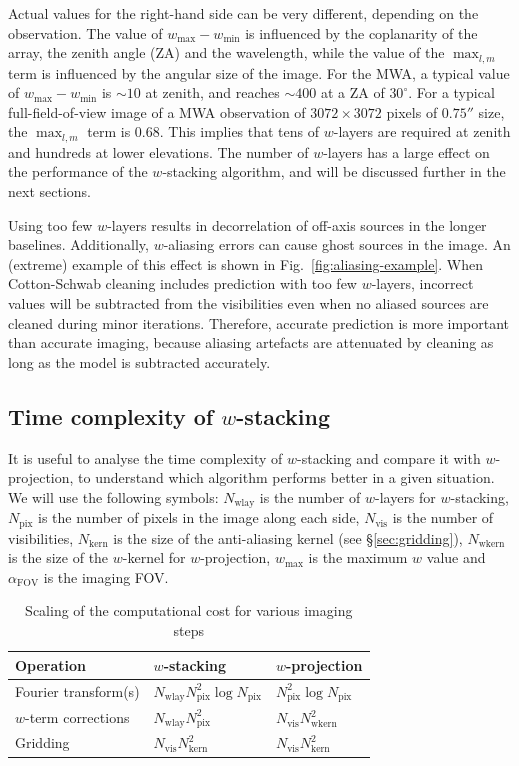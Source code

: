\documentclass[useAMS,usenatbib]{mn2e}
\begin{document}
Actual values for the right-hand side can be very different, depending on the observation. The value of $w_{\max} - w_{\min}$ is influenced by the coplanarity of the array, the zenith angle (ZA) and the wavelength, while the value of the $\max_{l,m}$ term is influenced by the angular size of the image. For the MWA, a typical value of $w_{\max} - w_{\min}$ is $\sim 10$ at zenith, and reaches $\sim 400$ at a ZA of $30^{\circ}$. For a typical full-field-of-view image of a MWA observation of $3072\times 3072$ pixels of $0.75''$ size, the $\max_{l,m}$ term is $0.68$. This implies that tens of $w$-layers are required at zenith and hundreds at lower elevations. The number of $w$-layers has a large effect on the performance of the $w$-stacking algorithm, and will be discussed further in the next sections.

Using too few $w$-layers results in decorrelation of off-axis sources in the longer baselines. Additionally, $w$-aliasing errors can cause ghost sources in the image. An (extreme) example of this effect is shown in Fig.~\ref{fig:aliasing-example}. When Cotton-Schwab cleaning includes prediction with too few $w$-layers, incorrect values will be subtracted from the visibilities even when no aliased sources are cleaned during minor iterations. Therefore, accurate prediction is more important than accurate imaging, because aliasing artefacts are attenuated by cleaning as long as the model is subtracted accurately.

\subsection{Time complexity of $w$-stacking} \label{sec:time-complexity}
It is useful to analyse the time complexity of $w$-stacking and compare it with $w$-projection, to understand which algorithm performs better in a given situation. We will use the following symbols: $N_\textrm{wlay}$ is the number of $w$-layers for $w$-stacking, $N_\textrm{pix}$ is the number of pixels in the image along each side, $N_\textrm{vis}$ is the number of visibilities, $N_\textrm{kern}$ is the size of the anti-aliasing kernel (see \S\ref{sec:gridding}), $N_\textrm{wkern}$ is the size of the $w$-kernel for $w$-projection, $w_{\max}$ is the maximum $w$ value and $\alpha_\textrm{FOV}$ is the imaging FOV.

\begin{table}
 \caption{Scaling of the computational cost for various imaging steps} \label{tbl:computational-cost-per-operation}
 \begin{tabular}{lll}
   \textbf{Operation} & \textbf{$w$-stacking} & \textbf{$w$-projection} \\
   \hline\hline
   Fourier transform(s) & $N_\textrm{wlay} N^2_\textrm{pix} \log N_\textrm{pix}$ & $N^2_\textrm{pix} \log N_\textrm{pix}$ \\
   $w$-term corrections   & $N_\textrm{wlay} N^2_\textrm{pix}$ & $N_\textrm{vis} N^2_\textrm{wkern}$ \\
   Gridding & $N_\textrm{vis}N^2_\textrm{kern}$ & $N_\textrm{vis} N_\textrm{kern}^2$ \\
   \hline\hline
 \end{tabular}
\end{table}
\end{document}
